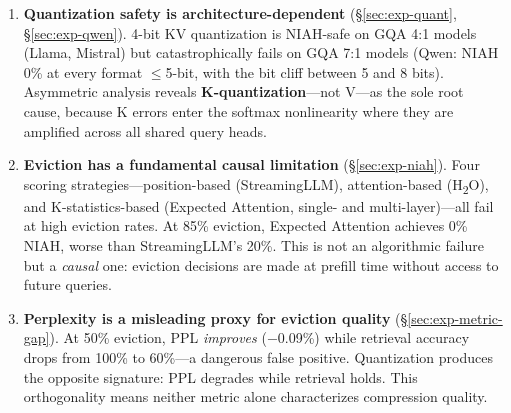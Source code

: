 \begin{enumerate}
    \item \textbf{Quantization safety is architecture-dependent} (\S\ref{sec:exp-quant}, \S\ref{sec:exp-qwen}). 4-bit KV quantization is NIAH-safe on GQA 4:1 models (Llama, Mistral) but catastrophically fails on GQA 7:1 models (Qwen: NIAH 0\% at every format $\leq$5-bit, with the bit cliff between 5 and 8 bits). Asymmetric analysis reveals \textbf{K-quantization}---not V---as the sole root cause, because K errors enter the softmax nonlinearity where they are amplified across all shared query heads.

    \item \textbf{Eviction has a fundamental causal limitation} (\S\ref{sec:exp-niah}). Four scoring strategies---position-based (StreamingLLM), attention-based (H\textsubscript{2}O), and K-statistics-based (Expected Attention, single- and multi-layer)---all fail at high eviction rates. At 85\% eviction, Expected Attention achieves 0\% NIAH, worse than StreamingLLM's 20\%. This is not an algorithmic failure but a \emph{causal} one: eviction decisions are made at prefill time without access to future queries.

    \item \textbf{Perplexity is a misleading proxy for eviction quality} (\S\ref{sec:exp-metric-gap}). At 50\% eviction, PPL \emph{improves} ($-$0.09\%) while retrieval accuracy drops from 100\% to 60\%---a dangerous false positive. Quantization produces the opposite signature: PPL degrades while retrieval holds. This orthogonality means neither metric alone characterizes compression quality.
\end{enumerate}

